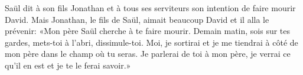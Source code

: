 Saül dit à son fils Jonathan et à tous ses serviteurs son intention de faire mourir David.
Mais Jonathan, le fils de Saül, aimait beaucoup David et il alla le prévenir:
	«Mon père Saül cherche à te faire mourir.
Demain matin, sois sur tes gardes, mets-toi à l’abri, dissimule-toi.
	Moi, je sortirai et je me tiendrai à côté de mon père dans le champ où tu seras.
Je parlerai de toi à mon père,
	je verrai ce qu’il en est et je te le ferai savoir.»
